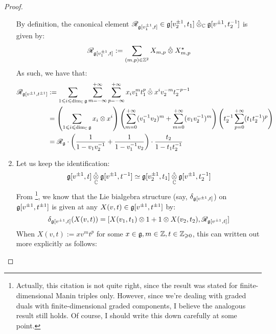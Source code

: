 \begin{proof}
\begin{enumerate}
                        By definition, the canonical element $\scrR_{\g[v_1^{\pm 1}, t]} \in \g[v_2^{\pm 1}, t_1] \hattensor_{\bbC} \g[v^{\pm 1}, t_2^{-1}]$ is given by:
                            $$\scrR_{\g[v_1^{\pm 1}, t]} := \sum_{(m, p) \in \Z^2} X_{m, p} \hattensor X_{m, p}^{\star}$$
                        As such, we have that:
                            $$
                                \begin{aligned}
                                    \scrR_{\g[v^{\pm 1}, t^{\pm 1}]} & := \sum_{1 \leq i \leq \dim_{\bbC} \g} \sum_{m = -\infty}^{+\infty} \sum_{p = -\infty}^{+\infty} x_i v_1^m t_1^p \hattensor x^i v_2^{-m} t_2^{-p - 1}
                                    \\
                                    & = \left( \sum_{1 \leq i \leq \dim_{\bbC} \g} x_i \tensor x^i \right) \left( \sum_{m = 0}^{+\infty} (v_1^{-1} v_2)^m + \sum_{m = 0}^{+\infty} (v_1 v_2^{-1})^m \right) \left( t_2^{-1} \sum_{p = 0}^{+\infty} (t_1 t_2^{-1})^p \right)
                                    \\
                                    & = \scrR_{\g} \cdot \left( \frac{1}{1 - v_1 v_2^{-1}} + \frac{1}{1 - v_1^{-1} v_2} \right) \cdot \frac{t_2}{1 - t_1 t_2^{-1}}
                                \end{aligned}
                            $$
                        \item Let us keep the identification:
                            $$\g[v^{\pm 1}, t] \hattensor_{\bbC} \g[v^{\pm 1}, t^{-1}] \cong \g[v_2^{\pm 1}, t_1] \hattensor_{\bbC} \g[v^{\pm 1}, t_2^{-1}]$$
                        From \cite[pp. 5]{etingof_kazhdan_quantisation_1}\footnote{Actually, this citation is not quite right, since the result was stated for finite-dimensional Manin triples only. However, since we're dealing with graded duals with finite-dimensional graded components, I believe the analogous result still holds. Of course, I should write this down carefully at some point.}, we know that the Lie bialgebra structure (say, $\delta_{\mathfrak{g}[v^{\pm 1}, t]}$) on $\mathfrak{g}[v^{\pm 1}, t^{\pm 1}]$ is given at any $X(v, t) \in \mathfrak{g}[v^{\pm 1}, t^{\pm 1}]$ by:
                            $$\delta_{\g[v^{\pm 1}, t]}( X(v, t) ) = [X(v_1, t_1) \tensor 1 + 1 \tensor X(v_2, t_2), \scrR_{\g[v^{\pm 1}, t]}]$$
                        When $X(v, t) := x v^m t^p$ for some $x \in \mathfrak{g}, m \in \mathbb{Z}, t \in \mathbb{Z}_{\geqslant 0}$, this can written out more explicitly as follows:
                            $$
$$
\end{enumerate}
\end{proof}
